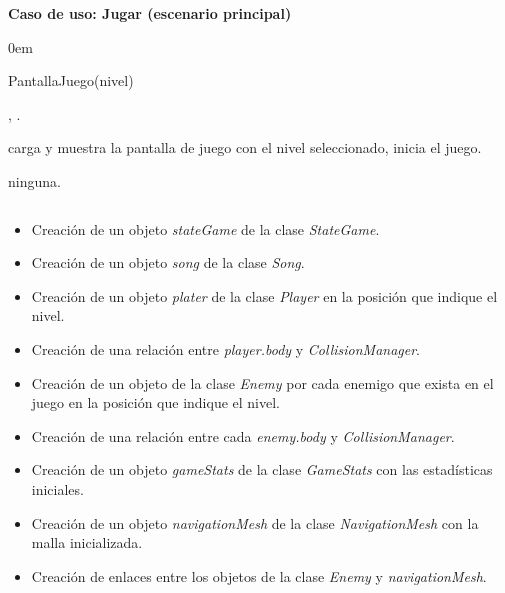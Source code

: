 \textbf{Caso de uso: Jugar (escenario principal)}


\begin{description}
    \itemsep0em
    \item [Operación] PantallaJuego(nivel)
    \item [Actores] \jugador, \sistema.
    \item [Responsabilidades] carga y muestra la pantalla de juego con el
    nivel seleccionado, inicia el juego.
    \item [Precondiciones] ninguna.
    \item [Postcondiciones] $\quad$
        \begin{itemize}
            \itemsep0em
            \item Creación de un objeto \textit{stateGame} de la clase
            \textit{StateGame}.
            \item Creación de un objeto \textit{song} de la clase \textit{Song}.
            \item Creación de un objeto \textit{plater} de la clase \textit{Player}
            en la posición que indique el nivel.
            \item Creación de una relación entre \textit{player.body} y 
            \textit{CollisionManager}.
            \item Creación de un objeto de la clase \textit{Enemy} por cada
            enemigo que exista en el juego en la posición que indique el nivel.
            \item Creación de una relación entre cada \textit{enemy.body}
            y \textit{CollisionManager}.
            \item Creación de un objeto \textit{gameStats} de la clase \textit{GameStats}
            con las estadísticas iniciales.
            \item Creación de un objeto \textit{navigationMesh} de la clase
            \textit{NavigationMesh} con la malla inicializada.
            \item Creación de enlaces entre los objetos de la clase \textit{Enemy}
            y \textit{navigationMesh}.\\
        \end{itemize}
\end{description}

